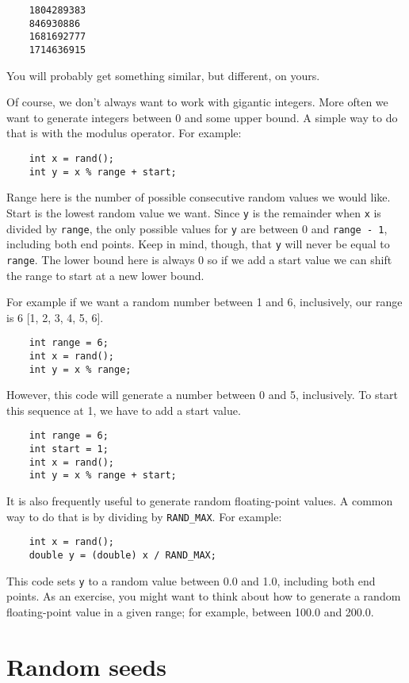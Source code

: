 \begin{verbatim}
    1804289383
    846930886
    1681692777
    1714636915
\end{verbatim}
%
You will probably get something similar, but different, on yours.

Of course, we don't always want to work with gigantic integers.
More often we want to generate integers between 0 and some
upper bound.  A simple way to do that is with the modulus
operator.  For example:

\begin{verbatim}
    int x = rand();
    int y = x % range + start;
\end{verbatim}
%
Range here is the number of possible consecutive random values we would like. 
Start is the lowest random value we want.  Since {\tt y} is the remainder when {\tt x} is divided by
{\tt range}, the only possible values for {\tt y}
are between 0 and {\tt range - 1}, including both
end points.   Keep in mind, though, that {\tt y} will never
be equal to {\tt range}. The lower bound here is always 0 so if we add a start value we can shift the range to start at a new lower bound.

For example if we want a random number between 1 and 6, inclusively, our range is 6  [1, 2, 3, 4, 5, 6]. 
\begin{verbatim}
    int range = 6;
    int x = rand();
    int y = x % range;
\end{verbatim}
%
However, this code will generate a number between 0 and 5,  inclusively. To start this sequence at 1, we have to add a start value.

\begin{verbatim}
    int range = 6;
    int start = 1;
    int x = rand();
    int y = x % range + start;
\end{verbatim}
%
It is also frequently useful to generate random floating-point values.
A common way to do that is by dividing by {\tt RAND\_MAX}.  For
example:

\begin{verbatim}
    int x = rand();
    double y = (double) x / RAND_MAX;
\end{verbatim}
%
This code sets {\tt y} to a random value between 0.0 and 1.0,
including both end points.  As an exercise, you might want to
think about how to generate a random floating-point value in
a given range; for example, between 100.0 and 200.0.


\section{Random seeds}
\label{Random seeds}

